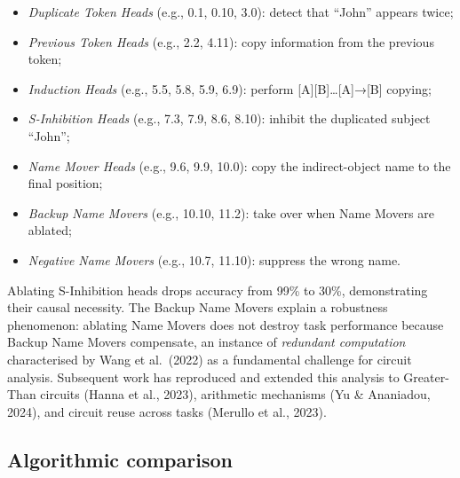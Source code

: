 \begin{itemize}
\tightlist
\item
  \emph{Duplicate Token Heads} (e.g., 0.1, 0.10, 3.0): detect that ``John'' appears twice;
\item
  \emph{Previous Token Heads} (e.g., 2.2, 4.11): copy information from the previous token;
\item
  \emph{Induction Heads} (e.g., 5.5, 5.8, 5.9, 6.9): perform {[}A{]}{[}B{]}\ldots{[}A{]}→{[}B{]} copying;
\item
  \emph{S-Inhibition Heads} (e.g., 7.3, 7.9, 8.6, 8.10): inhibit the duplicated subject ``John'';
\item
  \emph{Name Mover Heads} (e.g., 9.6, 9.9, 10.0): copy the indirect-object name to the final position;
\item
  \emph{Backup Name Movers} (e.g., 10.10, 11.2): take over when Name Movers are ablated;
\item
  \emph{Negative Name Movers} (e.g., 10.7, 11.10): suppress the wrong name.
\end{itemize}

Ablating S-Inhibition heads drops accuracy from 99\% to 30\%, demonstrating their causal necessity. The Backup Name Movers explain a robustness phenomenon: ablating Name Movers does not destroy task performance because Backup Name Movers compensate, an instance of \emph{redundant computation} characterised by Wang et al.~(2022) as a fundamental challenge for circuit analysis. Subsequent work has reproduced and extended this analysis to Greater-Than circuits (Hanna et al., 2023), arithmetic mechanisms (Yu \& Ananiadou, 2024), and circuit reuse across tasks (Merullo et al., 2023).

\subsection{Algorithmic comparison}\label{algorithmic-comparison}

